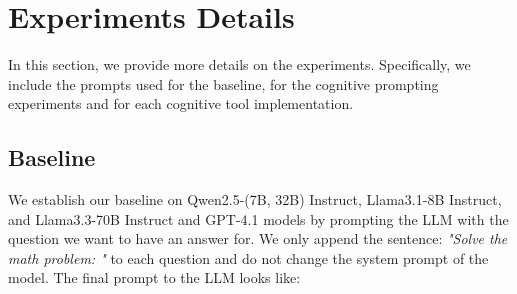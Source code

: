 \appendix






\section{Experiments Details}

In this section, we provide more details on the experiments.
Specifically, we include the prompts used for the baseline, for the cognitive prompting experiments and for each cognitive tool implementation.

\subsection{Baseline}

We establish our baseline on Qwen2.5-(7B, 32B) Instruct, Llama3.1-8B Instruct, and Llama3.3-70B Instruct and GPT-4.1 models by prompting the LLM with the question we want to have an answer for. We only append the sentence: \textit{"Solve the math problem: "} to each question and do not change the system prompt of the model. The final prompt to the LLM looks like: \\

\begin{center}
\end{center}

